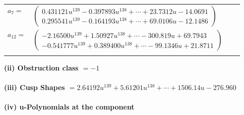 \documentclass[1p]{elsarticle_modified}
\theoremstyle{definition}
\begin{document}
\begin{tabular}{m{7pt} m{180pt} m{7pt} m{180pt} }
\flushright $a_{7}=$&$\begin{pmatrix}0.431121 u^{139}-0.397893 u^{138}+\cdots+23.7312 u-14.0691\\0.295541 u^{139}-0.164193 u^{138}+\cdots+69.0106 u-12.1486\end{pmatrix}$ \\
\flushright $a_{12}=$&$\begin{pmatrix}-2.16500 u^{139}+1.50927 u^{138}+\cdots-300.819 u+69.7943\\-0.541777 u^{139}+0.389400 u^{138}+\cdots-99.1346 u+21.8711\end{pmatrix}$\\&\end{tabular}
\flushleft \textbf{(ii) Obstruction class $= -1$}\\~\\
\flushleft \textbf{(iii) Cusp Shapes $= 2.64192 u^{139}+5.61201 u^{138}+\cdots+1506.14 u-276.960$}\\~\\
\newpage\renewcommand{\arraystretch}{1}
\flushleft \textbf{(iv) u-Polynomials at the component}\newline \\
\end{document}

